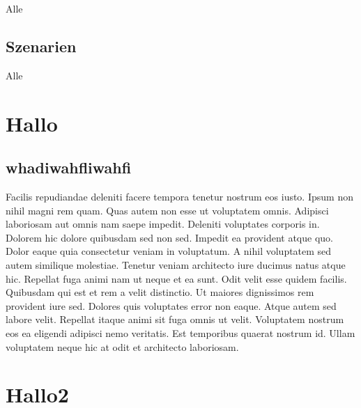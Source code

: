 \documentclass[
a4paper,     %
12pt         %
]{scrartcl}  %
\begin{document}
Alle
\subsection{Szenarien}
Alle




\section{Hallo}
\subsection{whadiwahfliwahfi}
Facilis repudiandae deleniti facere tempora tenetur nostrum eos iusto. Ipsum non nihil magni rem quam. Quas autem non esse ut voluptatem omnis.
Adipisci laboriosam aut omnis nam saepe impedit. Deleniti voluptates corporis in. Dolorem hic dolore quibusdam sed non sed.
Impedit ea provident atque quo. Dolor eaque quia consectetur veniam in voluptatum. A nihil voluptatem sed autem similique molestiae. Tenetur veniam architecto iure ducimus natus atque hic. Repellat fuga animi nam ut neque et ea sunt. Odit velit esse quidem facilis.
Quibusdam qui est et rem a velit distinctio. Ut maiores dignissimos rem provident iure sed. Dolores quis voluptates error non eaque. Atque autem sed labore velit. Repellat itaque animi sit fuga omnis ut velit.
Voluptatem nostrum eos ea eligendi adipisci nemo veritatis. Est temporibus quaerat nostrum id. Ullam voluptatem neque hic at odit et architecto laboriosam.
\section{Hallo2}










% 

% 
\end{document}
